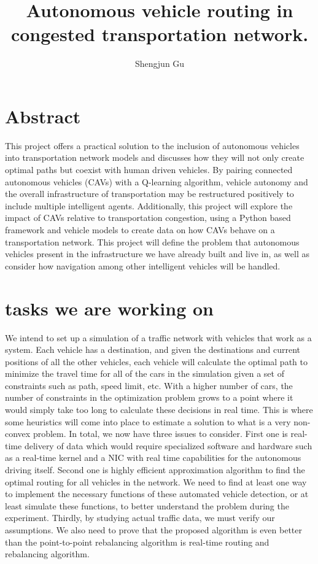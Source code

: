 \documentclass[letterpaper,10pt,draftclsnofoot,onecolumn]{IEEEtran}
\title{Autonomous vehicle routing in congested transportation network.}
\author{Shengjun Gu}
\begin{document}
\maketitle


\section{Abstract}

\setlength{\parindent}{7ex} This project offers a practical solution to the inclusion of autonomous vehicles into transportation network models and discusses how they will not only create optimal paths but coexist with human driven vehicles. By pairing connected autonomous vehicles (CAVs) with a Q-learning algorithm, vehicle autonomy and the overall infrastructure of transportation may be restructured positively to include multiple intelligent agents. Additionally, this project will explore the impact of CAVs relative to transportation congestion, using a Python based framework and vehicle models to create data on how CAVs behave on a transportation network. This project will define the problem that autonomous vehicles present in the infrastructure we have already built and live in, as well as consider how navigation among other intelligent vehicles will be handled.

\pagebreak


\section{tasks we are working on}
We intend to set up a simulation of a traffic network with vehicles that work as a system. Each vehicle has a destination, and given the destinations and current positions of all the other vehicles, each vehicle will calculate the optimal path to minimize the travel time for all of the cars in the simulation given a set of constraints such as path, speed limit, etc. With a higher number of cars, the number of constraints in the optimization problem grows to a point where it would simply take too long to calculate these decisions in real time. This is where some heuristics will come into place to estimate a solution to what is a very non-convex problem. In total, we now have three issues to consider. First one is real-time delivery of data which would require specialized software and hardware such as a real-time kernel and a NIC with real time capabilities for the autonomous driving itself. Second one is highly efficient approximation algorithm to find the optimal routing for all vehicles in the network. We need to find at least one way to implement the necessary functions of these automated vehicle detection, or at least simulate these functions, to better understand the problem during the experiment. Thirdly, by studying actual traffic data, we must verify our assumptions. We also need to prove that the proposed algorithm is even better than the point-to-point rebalancing algorithm is real-time routing and rebalancing algorithm.
\end{document}
